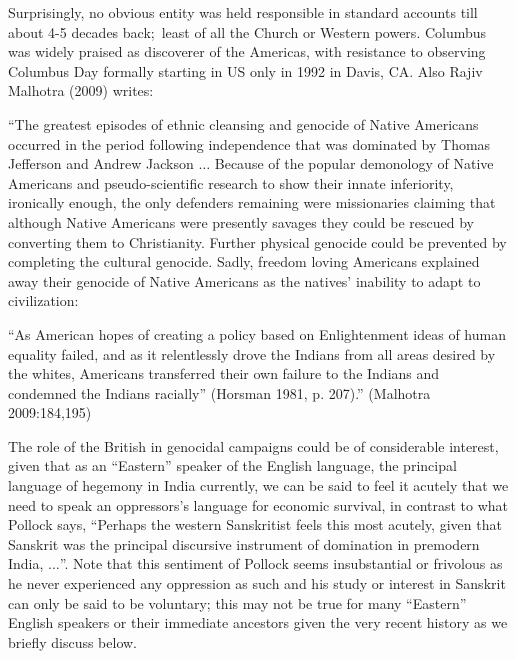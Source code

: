 Surprisingly, no obvious entity was held responsible in standard accounts till about 4-5 decades back; least of all the Church or Western powers. Columbus    was widely praised as discoverer of the Americas, with resistance to observing Columbus Day formally starting in US only in 1992 in Davis, CA\@. Also Rajiv Malhotra (2009) writes: 
\begin{myquote}
“The greatest episodes of ethnic cleansing and genocide of Native Americans occurred in the period following independence that was dominated by Thomas Jefferson and Andrew Jackson $\ldots$ Because of the popular demonology of Native Americans and pseudo-scientific research to show their innate inferiority, ironically enough, the only defenders remaining were missionaries claiming that although Native Americans were presently savages they could be rescued by converting them to Christianity. Further physical genocide could be prevented by
completing the cultural genocide. Sadly, freedom loving Americans explained away their genocide of Native Americans as the natives’ inability to adapt to civilization: 

“As American hopes of creating a policy based on Enlightenment ideas of human equality failed, and as it relentlessly drove the Indians from all areas desired by the whites, Americans transferred their own failure to the Indians and condemned the Indians racially” (Horsman 1981, p. 207).”   	\hfill(Malhotra 2009:184,195)
\end{myquote}

The role of the British in genocidal campaigns could be of considerable interest, given that as an “Eastern” speaker of the English language, the principal language of hegemony in India currently, we can be said to feel it acutely that we need to speak an oppressors’s language for economic survival, in contrast to what Pollock says, “Perhaps the western Sanskritist feels this most acutely, given that Sanskrit was the principal discursive instrument of domination in premodern India, $\ldots$”. Note that this sentiment of Pollock seems insubstantial or frivolous as he never experienced any oppression as such and his study or interest in Sanskrit can only be said to be voluntary; this may not be true for many “Eastern” English speakers or their immediate ancestors given the very recent history as we briefly discuss below.

